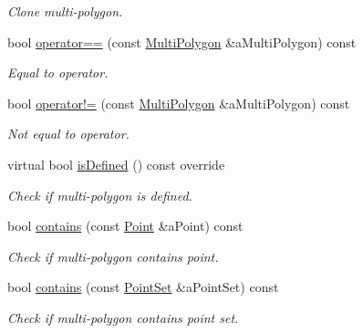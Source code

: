 \begin{DoxyCompactItemize}
\begin{DoxyCompactList}\small\item\em Clone multi-\/polygon. \end{DoxyCompactList}\item 
bool \hyperlink{classlibrary_1_1math_1_1geom_1_1d2_1_1objects_1_1_multi_polygon_a3032f68e33b1bb90cbf021008124bccd}{operator==} (const \hyperlink{classlibrary_1_1math_1_1geom_1_1d2_1_1objects_1_1_multi_polygon}{Multi\+Polygon} \&a\+Multi\+Polygon) const
\begin{DoxyCompactList}\small\item\em Equal to operator. \end{DoxyCompactList}\item 
bool \hyperlink{classlibrary_1_1math_1_1geom_1_1d2_1_1objects_1_1_multi_polygon_a7478631c89b146b6dcd4814a521c0200}{operator!=} (const \hyperlink{classlibrary_1_1math_1_1geom_1_1d2_1_1objects_1_1_multi_polygon}{Multi\+Polygon} \&a\+Multi\+Polygon) const
\begin{DoxyCompactList}\small\item\em Not equal to operator. \end{DoxyCompactList}\item 
virtual bool \hyperlink{classlibrary_1_1math_1_1geom_1_1d2_1_1objects_1_1_multi_polygon_a9afa806e12102255fc5abf8a94106089}{is\+Defined} () const override
\begin{DoxyCompactList}\small\item\em Check if multi-\/polygon is defined. \end{DoxyCompactList}\item 
bool \hyperlink{classlibrary_1_1math_1_1geom_1_1d2_1_1objects_1_1_multi_polygon_a9b11d0b3d9a341f541cebcd032227986}{contains} (const \hyperlink{classlibrary_1_1math_1_1geom_1_1d2_1_1objects_1_1_point}{Point} \&a\+Point) const
\begin{DoxyCompactList}\small\item\em Check if multi-\/polygon contains point. \end{DoxyCompactList}\item 
bool \hyperlink{classlibrary_1_1math_1_1geom_1_1d2_1_1objects_1_1_multi_polygon_a3a123cc4ebd6d157c1774176054617b6}{contains} (const \hyperlink{classlibrary_1_1math_1_1geom_1_1d2_1_1objects_1_1_point_set}{Point\+Set} \&a\+Point\+Set) const
\begin{DoxyCompactList}\small\item\em Check if multi-\/polygon contains point set. \end{DoxyCompactList}\item 

\end{DoxyCompactItemize}
